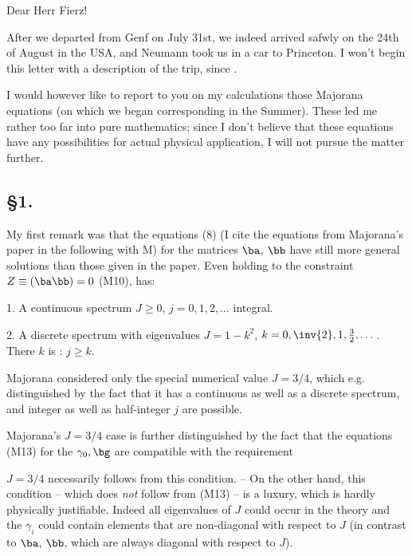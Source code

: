 \date{September 3, 1940}

Dear Herr Fierz!

After we departed from Genf on July 31st, we indeed arrived safwly on the 24th of August in the USA, and Neumann took us in a car to Princeton. I won't begin this letter with a description of the trip, since .

I would however like to report to you on my calculations those Majorana equations (on which we began corresponding in the Summer). These led me rather too far into pure mathematics; since I don't believe that these equations have any possibilities for actual physical application, I will not pursue the matter further.

\subsection*{§1.}

\nc{\bgamma}{\mathbf{\gamma}}

My first remark was that the equations (8) (I cite the equations from Majorana's paper in the following with M) for the matrices $\ba$, $\bb$ have still more general solutions than those given in the paper. Even holding to the constraint $Z \equiv (\ba\bb) = 0$ (M10), 
has:

1. A continuous spectrum $J\ge 0$, $j=0,1,2,\dots$ integral.

2. A discrete spectrum with eigenvalues $J=1-k^2$, $k=0, \inv{2}, 1, \frac{3}{2}, \dots$. There $k$ is : $j\geq k$.

Majorana considered only the special numerical value $J=3/4$, which e.g. distinguished by the fact that it has a continuous as well as a discrete spectrum, and integer as well as half-integer $j$ are possible.

Majorana's $J=3/4$ case is further distinguished by the fact that the equations (M13) for the $\gamma_0, \bg$ are compatible with the requirement

$J=3/4$ necessarily follows from this condition. -- On the other hand, this condition -- which does \textit{not} follow from (M13) -- is a luxury, which is hardly physically justifiable. Indeed all eigenvalues of $J$ could occur in the theory and the $\gamma_i$ could contain elements that are non-diagonal with respect to $J$ (in contrast to $\ba$, $\bb$, which are always diagonal with respect to $J$).

